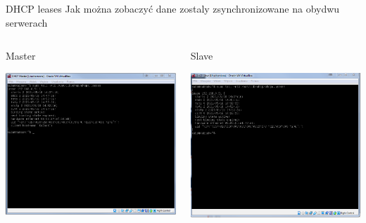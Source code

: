 \documentclass[presentation]{beamer}
\begin{document}
\begin{frame}[label={sec:orgddeabf9}]{DHCP leases}
Jak można zobaczyć dane zostaly zsynchronizowane na obydwu serwerach
\begin{columns}
\begin{column}{0.55\columnwidth}
\begin{block}{Master}
\begin{center}
\includegraphics[width=.9\linewidth]{./data/dhcp/9_master.png}
\end{center}
\end{block}
\end{column}
\begin{column}{0.55\columnwidth}
\begin{block}{Slave}
\begin{center}
\includegraphics[width=.9\linewidth]{./data/dhcp/9_slave.png}
\end{center}
\end{block}
\end{column}
\end{columns}
\end{frame}
\end{document}

